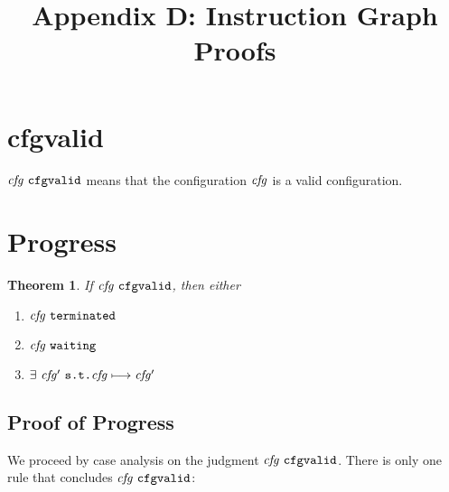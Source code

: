 \documentclass[12pt]{article}
\title{Appendix D: Instruction Graph Proofs}
\author{}
\date{}
\begin{document}
\maketitle

\thispagestyle{simple}

\newtheorem{thm}{Theorem}

\section{cfgvalid}

$\cfgvalid{\nterm{cfg}}$ means that the configuration $\nterm{cfg}$ is a valid
configuration.

\begin{mathpar}
   
\end{mathpar}

\section{Progress}

\begin{thm}
If $\cfgvalid{\nterm{cfg}}$, then either
\begin{enumerate}
  \item $\terminated{\nterm{cfg}}$
  \item $\waiting{\nterm{cfg}}$
  \item $\exists\ \nterm{cfg'}\ \texttt{s.t.} \steps{\nterm{cfg}}{\nterm{cfg'}}$
\end{enumerate}
\end{thm}

\subsection{Proof of Progress}

We proceed by case analysis on the judgment $\cfgvalid{\nterm{cfg}}$. There is
only one rule that concludes $\cfgvalid{\nterm{cfg}}$:

\begin{mathpar}
\end{mathpar}
\end{document}

